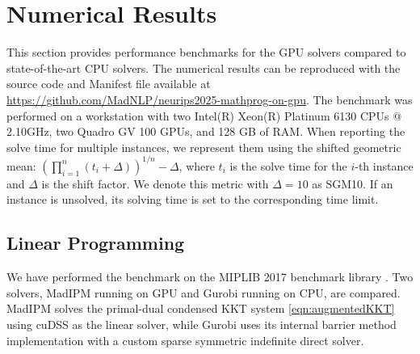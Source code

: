 \documentclass{article}
\begin{document}
\section{Numerical Results}\label{eqn:num}
This section provides performance benchmarks for the GPU solvers compared to state-of-the-art CPU solvers. The numerical results can be reproduced with the source code and Manifest file available at \url{https://github.com/MadNLP/neurips2025-mathprog-on-gpu}. The benchmark was performed on a workstation with two Intel(R) Xeon(R) Platinum 6130 CPUs @ 2.10GHz, two Quadro GV 100 GPUs, and 128 GB of RAM. When reporting the solve time for multiple instances, we represent them using the shifted geometric mean: $\left(\prod_{i=1}^n (t_i + \Delta)\right)^{1/n} - \Delta$, where $t_i$ is the solve time for the $i$-th instance and $\Delta$ is the shift factor. We denote this metric with $\Delta = 10$ as SGM10. If an instance is unsolved, its solving time is set to the corresponding time limit.



\subsection{Linear Programming}
We have performed the benchmark on the MIPLIB 2017 benchmark library \cite{gleixnerMIPLIB2017Datadriven2021}.
Two solvers, MadIPM running on GPU and Gurobi running on CPU, are compared.
MadIPM solves the primal-dual condensed KKT system \cref{eqn:augmentedKKT} using cuDSS as the linear solver, while Gurobi uses its internal barrier method implementation with a custom sparse symmetric indefinite direct solver.
\end{document}
